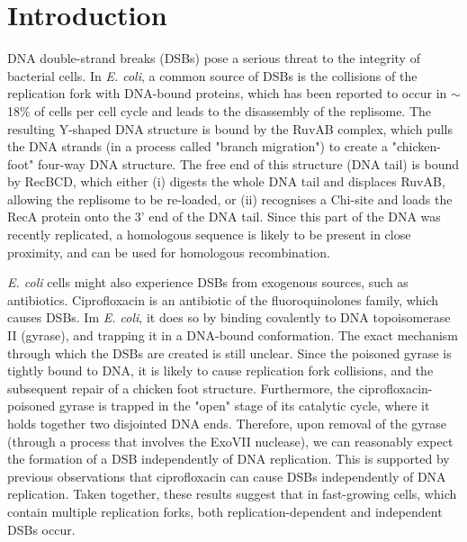 \section*{Introduction}

DNA double-strand breaks (DSBs) pose a serious threat to the integrity of bacterial cells. In \emph{E. coli}, a common source of DSBs is the collisions of the replication fork with DNA-bound proteins, which has been reported to occur in $\sim$18\% of cells per cell cycle\cite{Sinha2018} and leads to the disassembly of the replisome\cite{Michel1997}. The resulting Y-shaped DNA structure is bound by the RuvAB complex, which pulls the DNA strands (in a process called "branch migration") to create a "chicken-foot" four-way DNA structure\cite{Seigneur1998}. The free end of this structure (DNA tail) is bound by RecBCD, which either (i) digests the whole DNA tail and displaces RuvAB, allowing the replisome to be re-loaded, or (ii) recognises a Chi-site and loads the RecA protein onto the 3' end of the DNA tail\cite{Michel2001}. Since this part of the DNA was recently replicated, a homologous sequence is likely to be present in close proximity, and can be used for homologous recombination.

\emph{E. coli} cells might also experience DSBs from exo\-genous sources, such as anti\-biotics. Ciprofloxacin is an antibiotic of the fluoro\-quinolones family, which causes DSBs. Im \emph{E. coli}, it does so by binding covalently to DNA topoisomerase II (gyrase), and trapping it in a DNA-bound conformation\cite{Kohanski2010}. The exact mechanism through which the DSBs are created is still unclear. Since the poisoned gyrase is tightly bound to DNA, it is likely to cause replication fork collisions\cite{Wentzell2000, Drlica2008}, and the subsequent repair of a chicken foot structure. Furthermore, the ciprofloxacin-poisoned gyrase is trapped in the "open" stage of its catalytic cycle, where it holds together two disjointed DNA ends. Therefore, upon removal of the gyrase (through a process that involves the ExoVII nuclease\cite{Huang2021}), we can reasonably expect the formation of a DSB independently of DNA replication. This is supported by previous observations that ciprofloxacin can cause DSBs independently of DNA replication\cite{Zhao2006}. Taken together, these results suggest that in fast-growing cells, which contain multiple replication forks, both replication-dependent and independent DSBs occur.

